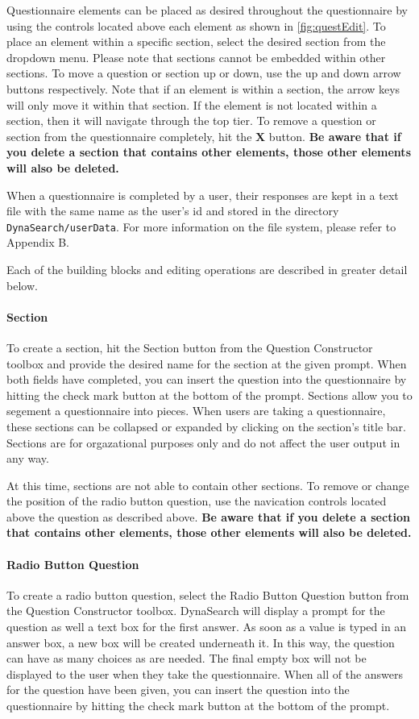 \documentclass[article]{ij4uq}              %
\begin{document}
Questionnaire elements can be placed as desired throughout the questionnaire by using the controls located above each element as shown in \ref{fig:questEdit}.  To place an element within a specific section, select the desired section from the dropdown menu.  Please note that sections cannot be embedded within other sections.  To move a question or section up or down, use the up and down arrow buttons respectively.  Note that if an element is within a section, the arrow keys will only move it within that section. If the element is not located within a section, then it will navigate through the top tier.  To remove a question or section from the questionnaire completely, hit the \textbf{X} button.  \textbf{Be aware that if you delete a section that contains other elements, those other elements will also be deleted.}

When a questionnaire is completed by a user, their responses are kept in a text file with the same name as the user's id and stored in the directory \texttt{DynaSearch/userData}. For more information on the file system, please refer to Appendix B.

 Each of the building blocks and editing operations are described in greater detail below.

\paragraph{Section}
To create a section, hit the Section button from the Question Constructor toolbox and provide the desired name for the section at the given prompt.  When both fields have completed, you can insert the question into the questionnaire by hitting the check mark button at the bottom of the prompt.  Sections allow you to segement a questionnaire into pieces.  When users are taking a questionnaire, these sections can be collapsed or expanded by clicking on the section's title bar.  Sections are for orgazational purposes only and do not affect the user output in any way.

 At this time, sections are not able to contain other sections.  To remove or change the position of the radio button question, use the navication controls located above the question as described above. \textbf{Be aware that if you delete a section that contains other elements, those other elements will also be deleted.}

\paragraph{Radio Button Question}
To create a radio button question, select the Radio Button Question button from the Question Constructor toolbox. DynaSearch will display a prompt for the question as well a text box for the first answer.  As soon as a value is typed in an answer box, a new box will be created underneath it.  In this way, the question can have as many choices as are needed.  The final empty box will not be displayed to the user when they take the questionnaire.  When all of the answers for the question have been given, you can insert the question into the questionnaire by hitting the check mark button at the bottom of the prompt.
\end{document}

